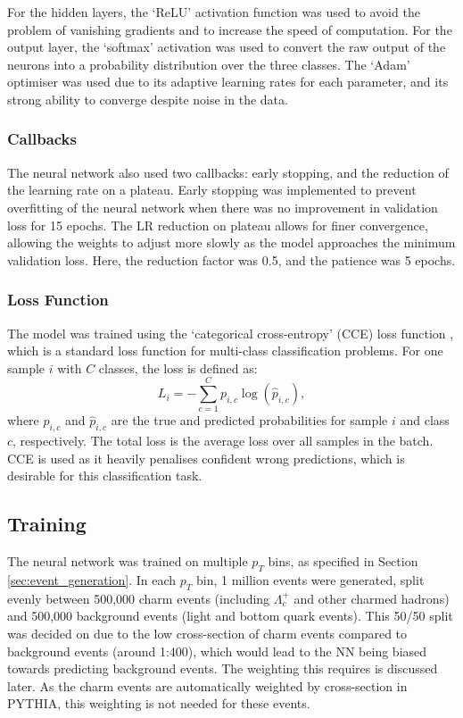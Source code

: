 \documentclass[12pt]{article}
\begin{document}
For the hidden layers, the `ReLU' activation function was used to avoid the problem of vanishing gradients and to increase the speed of computation. For the output layer, the `softmax' activation was used to convert the raw output of the neurons into a probability distribution over the three classes. The `Adam' optimiser was used due to its adaptive learning rates for each parameter, and its strong ability to converge despite noise in the data.

\subsubsection{Callbacks}
The neural network also used two callbacks: early stopping, and the reduction of the learning rate on a plateau. Early stopping was implemented to prevent overfitting of the neural network when there was no improvement in validation loss for 15 epochs. The LR reduction on plateau allows for finer convergence, allowing the weights to adjust more slowly as the model approaches the minimum validation loss. Here, the reduction factor was 0.5, and the patience was 5 epochs.

\subsubsection{Loss Function}
The model was trained using the `categorical cross-entropy' (CCE) loss function \cite{CCE}, which is a standard loss function for multi-class classification problems. For one sample $i$ with $C$ classes, the loss is defined as:
\begin{equation}
    L_i = -\sum^{C}_{c=1} p_{i,c} \log(\hat{p}_{i,c}),
\end{equation}
where $p_{i,c}$ and $\hat{p}_{i,c}$ are the true and predicted probabilities for sample $i$ and class $c$, respectively. The total loss is the average loss over all samples in the batch. CCE is used as it heavily penalises confident wrong predictions, which is desirable for this classification task.

\subsection{Training}
The neural network was trained on multiple $p_T$ bins, as specified in Section \ref{sec:event_generation}. In each $p_T$ bin, 1 million events were generated, split evenly between 500,000 charm events (including $\Lambda_c^+$ and other charmed hadrons) and 500,000 background events (light and bottom quark events). This 50/50 split was decided on due to the low cross-section of charm events compared to background events (around 1:400), which would lead to the NN being biased towards predicting background events. The weighting this requires is discussed later. As the charm events are automatically weighted by cross-section in PYTHIA, this weighting is not needed for these events.
\end{document}
